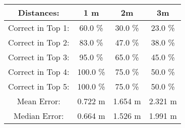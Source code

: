 \begin{tabular}{| c || c | c | c |}
\hline
Distances: & 1 m & 2m & 3m \\
\hline
\hline
Correct in Top 1: & 60.0 \% & 30.0 \% & 23.0 \% \\
\hline
Correct in Top 2: & 83.0 \% & 47.0 \% & 38.0 \% \\
\hline
Correct in Top 3: & 95.0 \% & 65.0 \% & 45.0 \% \\
\hline
Correct in Top 4: & 100.0 \% & 75.0 \% & 50.0 \% \\
\hline
Correct in Top 5: & 100.0 \% & 75.0 \% & 50.0 \% \\
\hline
\hline
Mean Error: & 0.722 m & 1.654 m & 2.321 m \\
\hline
Median Error: & 0.664 m & 1.526 m & 1.991 m \\
\hline
\end{tabular}
